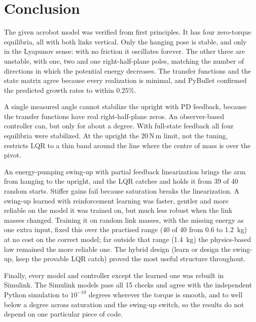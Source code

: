 \documentclass[12pt,a4paper]{article}
\newcommand{\Nm}{\,\mathrm{N\,m}}
\begin{document}
\section{Conclusion}
The given acrobot model was verified from first principles. It has four zero-torque equilibria, all with both links vertical. Only the hanging pose is stable, and only in the Lyapunov sense: with no friction it oscillates forever. The other three are unstable, with one, two and one right-half-plane poles, matching the number of directions in which the potential energy decreases. The transfer functions and the state matrix agree because every realization is minimal, and PyBullet confirmed the predicted growth rates to within $0.25\%$.

A single measured angle cannot stabilize the upright with PD feedback, because the transfer functions have real right-half-plane zeros. An observer-based controller can, but only for about a degree. With full-state feedback all four equilibria were stabilized. At the upright the $20\Nm$ limit, not the tuning, restricts LQR to a thin band around the line where the centre of mass is over the pivot.

An energy-pumping swing-up with partial feedback linearization brings the arm from hanging to the upright, and the LQR catches and holds it from 39 of 40 random starts. Stiffer gains fail because saturation breaks the linearization. A swing-up learned with reinforcement learning was faster, gentler and more reliable on the model it was trained on, but much less robust when the link masses changed. Training it on random link masses, with the missing energy as one extra input, fixed this over the practised range (40 of 40 from 0.6 to 1.2~kg) at no cost on the correct model; far outside that range (1.4~kg) the physics-based law remained the more reliable one. The hybrid design (learn or design the swing-up, keep the provable LQR catch) proved the most useful structure throughout.

Finally, every model and controller except the learned one was rebuilt in Simulink. The Simulink models pass all 15 checks and agree with the independent Python simulation to $10^{-10}$ degrees wherever the torque is smooth, and to well below a degree across saturation and the swing-up switch, so the results do not depend on one particular piece of code.

\end{document}
